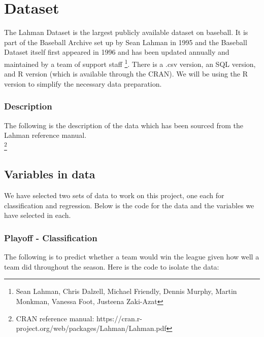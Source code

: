 \documentclass[11pt,a4paper]{report}
\begin{document}
\section{Dataset}
The Lahman Dataset is the largest publicly available dataset on baseball. It is part of the Baseball Archive set up by Sean Lahman in 1995 and the Baseball Dataset itself first appeared in 1996 and has been updated annually and maintained by a team of support staff \cite{Lahman} \footnote{Sean Lahman, Chris Dalzell, Michael Friendly, Dennis Murphy, Martin Monkman, Vanessa Foot, Justeena Zaki-Azat}. There is a .csv version, an SQL version, and R version (which is available through the CRAN). We will be using the R version to simplify the necessary data preparation.

\subsubsection{Description}
The following is the description of the data which has been sourced from the Lahman reference manual.\cite{Lahman}\\
\footnote{CRAN reference manual: https://cran.r-project.org/web/packages/Lahman/Lahman.pdf}

\subsection{Variables in data}
We have selected two sets of data to work on this project, one each for classification and regression. Below is the code for the data and the variables we have selected in each.

\subsubsection{Playoff - Classification}
The following is to predict whether a team would win the league given how well a team did throughout the season. Here is the code to isolate the data:
\end{document}
